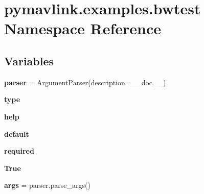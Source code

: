 \hypertarget{namespacepymavlink_1_1examples_1_1bwtest}{}\section{pymavlink.\+examples.\+bwtest Namespace Reference}
\label{namespacepymavlink_1_1examples_1_1bwtest}
\subsection*{Variables}
\begin{DoxyCompactItemize}
\item 
\mbox{\label{namespacepymavlink_1_1examples_1_1bwtest_afe076f1a3d008cd525c26a2a33b3d97f}} 
{\bfseries parser} = Argument\+Parser(description=\+\_\+\+\_\+doc\+\_\+\+\_\+)
\item 
\mbox{\label{namespacepymavlink_1_1examples_1_1bwtest_afbde17ba1802e5962a67d9e3977f29c7}} 
{\bfseries type}
\item 
\mbox{\label{namespacepymavlink_1_1examples_1_1bwtest_a8fd8509719d18e925ccec358a8dc0682}} 
{\bfseries help}
\item 
\mbox{\label{namespacepymavlink_1_1examples_1_1bwtest_a77a2ab871e0aaf94ccf5bc881a5dbba4}} 
{\bfseries default}
\item 
\mbox{\label{namespacepymavlink_1_1examples_1_1bwtest_a75801b54e117a46a4f239b09fc2c27b6}} 
{\bfseries required}
\item 
\mbox{\label{namespacepymavlink_1_1examples_1_1bwtest_a66efa427cd2ab3c171e5342a383659ae}} 
{\bfseries True}
\item 
\mbox{\label{namespacepymavlink_1_1examples_1_1bwtest_a033827b08f1d3dac4a810807b931550e}} 
{\bfseries args} = parser.\+parse\+\_\+args()
\item 
\mbox{\label{namespacepymavlink_1_1examples_1_1bwtest_a992c5d2dd65ab9fdb16be40008f497a6}} 

\end{DoxyCompactItemize}
